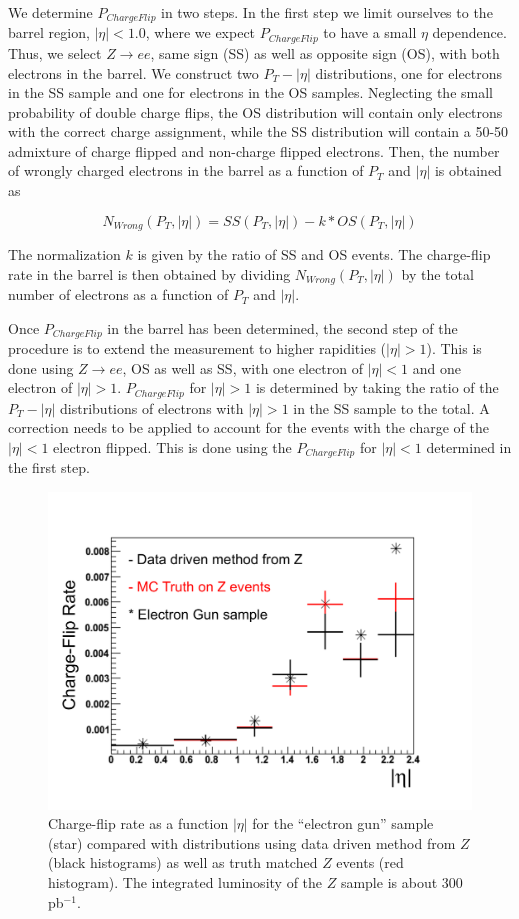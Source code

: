 We determine $P_{ChargeFlip}$ in two steps.  In the first step we limit ourselves
to the barrel region, $|\eta| < 1.0$, where we expect $P_{ChargeFlip}$ to have 
a small $\eta$ dependence.  Thus, we select $Z \to ee$, same sign (SS) as well as
opposite sign (OS), with both electrons in the barrel.  
We construct two $P_T-|\eta|$
distributions, one for electrons in the SS sample and 
one for electrons in the OS samples.  Neglecting the small 
probability of double charge flips, the OS distribution will contain only
electrons with the correct charge assignment, while the SS distribution
will contain a 50-50 admixture of charge flipped and non-charge flipped
electrons.  Then, 
the number of wrongly charged electrons in the barrel as a function
of $P_T$ and $|\eta|$ is obtained as

\begin{equation}
  N_{Wrong}(P_T, |\eta|) = SS(P_T, |\eta|) - k * OS(P_T, |\eta|) 
\end{equation}

The normalization $k$ is given by the ratio of SS and OS events.
The charge-flip rate in the barrel is then obtained by dividing 
$N_{Wrong}(P_T, |\eta|)$ by the total number of electrons as a 
function of $P_T$ and $|\eta|$.

Once $P_{ChargeFlip}$ in the barrel has been determined, the second step
of the procedure is to extend the measurement to higher rapidities 
($|\eta|>1$).  This is done using $Z \to ee$, OS as well as SS, with 
one electron of $|\eta|<1$ and one electron of $|\eta|>1$.  
$P_{ChargeFlip}$ for $|\eta|>1$ is determined by taking the ratio
of the $P_T-|\eta|$ distributions of electrons with 
$|\eta|>1$ in the SS sample to the total.  A correction needs to 
be applied to account for the events with the charge of the
$|\eta|<1$ electron flipped.  This is done using the  $P_{ChargeFlip}$
for $|\eta|<1$ determined in the first step.


\begin{figure}[htb]
\begin{center}
\includegraphics[width=0.7\linewidth]{figs/fr_rate.pdf}
\caption{Charge-flip rate as a function $|\eta|$ for the ``electron gun'' sample (star) compared with 
distributions using data driven method from $Z$ (black histograms) as well as truth matched $Z$ events 
(red histogram). The integrated luminosity of the $Z$ sample is about 300 pb$^{-1}$.  
\label{fig:charge_fliprate}}
\end{center}
\end{figure}


